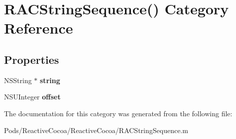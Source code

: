 \hypertarget{category_r_a_c_string_sequence_07_08}{}\section{R\+A\+C\+String\+Sequence() Category Reference}
\label{category_r_a_c_string_sequence_07_08}
\subsection*{Properties}
\begin{DoxyCompactItemize}
\item 
\mbox{\label{category_r_a_c_string_sequence_07_08_a3a80a3992cb423df66a82bcc6ec76c70}} 
N\+S\+String $\ast$ {\bfseries string}
\item 
\mbox{\label{category_r_a_c_string_sequence_07_08_abb7ce088681916033c8fbf00fdd89a28}} 
N\+S\+U\+Integer {\bfseries offset}
\end{DoxyCompactItemize}


The documentation for this category was generated from the following file\+:\begin{DoxyCompactItemize}
\item 
Pods/\+Reactive\+Cocoa/\+Reactive\+Cocoa/R\+A\+C\+String\+Sequence.\+m\end{DoxyCompactItemize}

